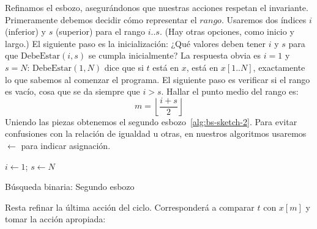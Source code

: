   Refinamos el esbozo,
  asegurándonos que nuestras acciones respetan el invariante.
  Primeramente debemos decidir
  cómo representar el \(\mathit{rango}\).
  Usaremos dos índices \(i\) (inferior)
  y \(s\) (superior) para el rango \(i..s\).
  (Hay otras opciones,
   como inicio y largo.)
  El siguiente paso es la inicialización:
  ¿Qué valores deben tener \(i\) y \(s\) para que
  \(\mathrm{DebeEstar}(i, s)\) se cumpla inicialmente?
  La respuesta obvia es \(i = 1\) y \(s = N\):
  \(\mathrm{DebeEstar}(1, N)\) dice que si \(t\) está en \(x\),
  está en \(x[1..N]\),
  exactamente lo que sabemos al comenzar el programa.
  El siguiente paso es verificar si el rango es vacío,
  cosa que se da siempre que \(i > s\).
  Hallar el punto medio del rango es:
  \begin{equation*}
    m = \left\lfloor \frac{i + s}{2} \right\rfloor
  \end{equation*}
  Uniendo las piezas
  obtenemos el segundo esbozo~\ref{alg:bs-sketch-2}.
  Para evitar confusiones con la relación de igualdad u otras,
  en nuestros algoritmos
  usaremos \(\leftarrow\) para indicar asignación.
  \begin{algorithm}
    \DontPrintSemicolon

    \(i \leftarrow 1\); \(s \leftarrow N\) \;
    \caption{Búsqueda binaria: Segundo esbozo}
    \label{alg:bs-sketch-2}
  \end{algorithm}
  Resta refinar la última acción del ciclo.
  Corresponderá a comparar \(t\) con \(x[m]\)
  y tomar la acción apropiada:

  \begin{algorithm}[H]
    \DontPrintSemicolon

     \;
     \;
     \;
  \end{algorithm}

